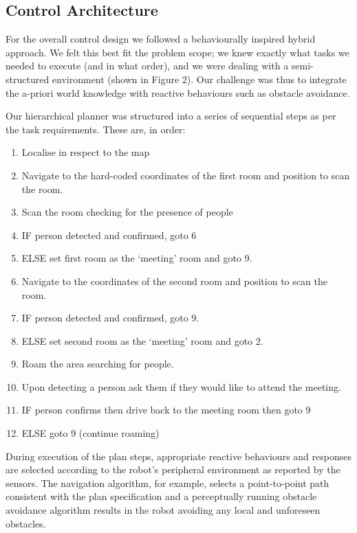 \documentclass{article}
\begin{document}
\begin{multicols}{2}
	\subsection{Control Architecture}
	For the overall control design we followed a behaviourally inspired hybrid approach. We felt this best fit the problem scope; we knew exactly what tasks we needed to execute (and in what order), and we were dealing with a semi-structured environment (shown in Figure 2). Our challenge was thus to integrate the a-priori world knowledge with reactive behaviours such as obstacle avoidance. 

Our hierarchical planner was structured into a series of sequential steps as per the task requirements. These are, in order:
\begin{enumerate}[topsep=0pt,itemsep=-1ex,partopsep=1ex,parsep=1ex]
\item Localise in respect to the map
\item  Navigate to the hard-coded coordinates of the first room and position to scan the room.
\item  Scan the room checking for the presence of people
\item  IF person detected and confirmed, goto 6
\item  ELSE set first room as the ‘meeting’ room and goto 9.
\item  Navigate to the coordinates of the second room and position to scan the room.
\item  IF person detected and confirmed, goto 9.
\item  ELSE set second room as the ‘meeting’ room and goto 2.
\item  Roam the area searching for people.
\item  Upon detecting a person ask them if they would like to attend the meeting.
\item  IF person confirms then drive back to the meeting room then goto 9
\item  ELSE goto 9 (continue roaming)
\end{enumerate}

During execution of the plan steps, appropriate reactive behaviours and responses are selected according to the robot’s peripheral environment as reported by the sensors. The navigation algorithm, for example, selects a point-to-point path consistent with the plan specification and a perceptually running obstacle avoidance algorithm results in the robot avoiding any local and unforeseen obstacles.
	

\end{multicols}
\end{document}
